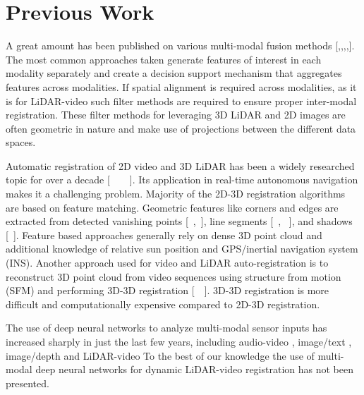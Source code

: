\documentclass{article}
\begin{document}

\section{Previous Work} %
\label{sec:previous_work}


A great amount has been published on various multi-modal fusion methods [\cite{Ross2003Informatio},\cite{Gregor2011Learning-R},\cite{Wu2004Optimal-Mu},\cite{Ross2003Informatio},\cite{Snoek2006The-Challe}]. The most common approaches taken generate features of interest in each modality separately and create a decision support mechanism that aggregates features across modalities. If spatial alignment is required across modalities, as it is for LiDAR-video such filter methods \cite{Thrun2011Googles-dr} are required to ensure proper inter-modal registration. These filter methods for leveraging 3D LiDAR and 2D images are often geometric in nature and make use of projections between the different data spaces. 

Automatic registration of 2D video and 3D LiDAR has been a widely researched topic for over a decade [~\cite{ Wang2009A-Robust-A}~\cite{Kim2014Automatic-}~\cite{Mastin2009Automatic-}~\cite{Bodensteiner2012Real-time-}]. Its application in real-time autonomous navigation makes it a challenging problem. Majority of the 2D-3D registration algorithms are based on feature matching. Geometric features like corners and edges are extracted from detected vanishing points [~\cite{Liu2007-Vanishing-points},~\cite{Ding2008-Vanishing-point}], line segments [~\cite{Frueh2004-Linesegment}, ~\cite{Stamos2008-Linesegment}], and shadows [~\cite{Troccoli2004-ashadow}]. Feature based approaches generally rely on dense 3D point cloud and additional knowledge of relative sun position and GPS/inertial navigation system (INS). Another approach used for video and LiDAR auto-registration is to reconstruct 3D point cloud from video sequences using structure from motion (SFM) and performing 3D-3D registration [~\cite{Zhao2004-alignment-3Dcloud}~\cite{Liu2006-alignment-sfm}]. 3D-3D registration is more difficult and computationally expensive compared to 2D-3D registration. 

The use of deep neural networks to analyze multi-modal sensor inputs  has increased sharply in just the last few years, including audio-video \cite{Ngiam2011Multimodal} \cite{Kim2013Deep-Learn}, image/text \cite{Srivastava2012Multimodal}, image/depth \cite{Lenz2013Deep-Learn} and LiDAR-video To the best of our knowledge the use of multi-modal deep neural networks for dynamic LiDAR-video registration has not been presented.
\end{document}
